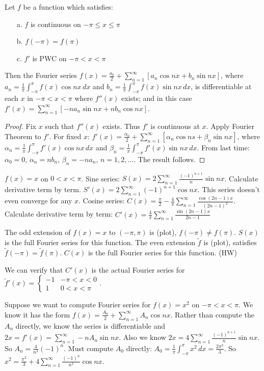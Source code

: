 \documentclass[]{article}
\begin{document}
\begin{theorem}
	Let $f$ be a function which satisfies:
	\begin{itemize}
		\item[a.] $f$ is continuous on $-\pi\leq x\leq \pi$
		\item[b.] $f(-\pi)=f(\pi)$
		\item[c.] $f'$ is PWC on $-\pi<x<\pi$
	\end{itemize}
	Then the Fourier series $f(x)=\frac{a_0}{2} + \sum_{n=1}^\infty [a_n\cos{nx} + b_n\sin{nx}]$, where $a_n=\frac{1}{\pi}\int_{-\pi}^\pi f(x) \cos{nx} \, dx$ and $b_n = \frac{1}{\pi} \int_{-\pi}^\pi f(x) \sin{nx}\, dx$, is differentiable at each $x$ in $-\pi<x<\pi$ where $f''(x)$ exists; and in this case $f'(x) = \sum_{n=1}^\infty [-na_n\sin{nx} + nb_n\cos{nx}]$.
\end{theorem}
\begin{proof}
	Fix $x$ such that $f''(x)$ exists. Thus $f'$ is continuous at $x$. Apply Fourier Theorem to $f'$.
	For fixed $x$: $f'(x)=\frac{\alpha_0}{2} + \sum_{n=1}^\infty [\alpha_n \cos{ns} + \beta_n\sin{nx}]$, where $\alpha_n = \frac{1}{\pi}\int_{-\pi}^\pi f'(x) \cos{nx}\, dx$ and $\beta_n = \frac{1}{\pi}\int_{-\pi}^\pi f'(x) \sin{nx} \, dx$.
	From last time: $\alpha_0 = 0$, $\alpha_n = nb_n$, $\beta_n = -na_n$, $n=1,2,\dots$. The result follows.
\end{proof}
\begin{example}
	$f(x) = x$ on $0<x<\pi$.
	Sine series: $S(x) = 2\sum_{n=1}^\infty \frac{(-1)^{n+1}}{n}\sin{nx}$. Calculate derivative term by term. $S'(x) = 2\sum_{n=1}^\infty (-1)^{n+1} \cos{nx}$. This series doesn't even converge for any $x$.
	Cosine series: $C(x) = \frac{\pi}{2} - \frac{4}{\pi} \sum_{n=1}^\infty \frac{\cos{(2n-1)x}}{(2n-1)^2}$. Calculate derivative term by term: $C'(x) = \frac{4}{\pi} \sum_{n=1}^\infty \frac{\sin{(2n-1)x}}{2n-1}$
	\begin{note}
		The odd extension of $f(x) = x$ to $(-\pi,\pi)$ is (plot), $f(-\pi)\neq f(\pi)$. $S(x)$ is the full Fourier series for this function. The even extension $\tilde{f}$ is (plot), satisfies $\tilde{f}(-\pi)=\tilde{f}(\pi)$. $C(x)$ is the full Fourier series for this function. (HW)
	\end{note}
	We can verify that $C'(x)$ is the actual Fourier series for $\tilde{f}'(x) = \begin{cases} -1 & -\pi<x<0 \\ 1 & 0<x<\pi \end{cases}$.
\end{example}
\begin{example}
	Suppose we want to compute Fourier series for $f(x)=x^2$ on $-\pi<x<\pi$. We know it has the form $f(x) = \frac{A_0}{2} + \sum_{n=1}^\infty A_n\cos{nx}$. Rather than compute the $A_n$ directly, we know the series is differentiable and $2x = f'(x) = \sum_{n=1}^\infty -nA_n\sin{nx}$.
	Also we know $2x = 4\sum_{n=1}^\infty \frac{(-1)^{n+1}}{n}\sin{nx}$. So $A_n = \frac{4}{n^2}(-1)^n$.
	Must compute $A_0$ directly: $A_0 = \frac{1}{\pi}\int_{-\pi}^\pi x^2\, dx = \frac{2\pi^2}{3}$. So $x^2 = \frac{\pi^2}{3} + 4\sum_{n=1}^\infty \frac{(-1)^n}{n^2}\cos{nx}$.
\end{example}
\end{document}
